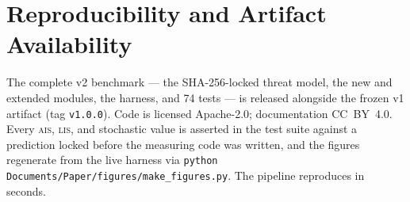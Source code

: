 \documentclass[11pt]{article}
\newcommand{\ais}{\textsc{ais}}
\newcommand{\lis}{\textsc{lis}}
\newcommand{\code}[1]{\texttt{#1}}
\begin{document}
\section*{Reproducibility and Artifact Availability}
The complete v2 benchmark --- the SHA-256-locked threat model, the new and
extended modules, the harness, and 74 tests --- is released alongside the
frozen v1 artifact (tag \code{v1.0.0}). Code is licensed Apache-2.0;
documentation CC~BY~4.0. Every \ais{}, \lis{}, and stochastic value is
asserted in the test suite against a prediction locked before the measuring
code was written, and the figures regenerate from the live harness via
\code{python Documents/Paper/figures/make\_figures.py}. The pipeline
reproduces in seconds.
\end{document}

